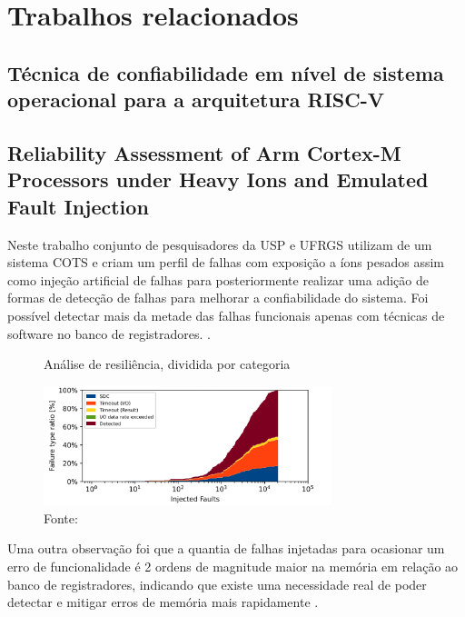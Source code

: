 \section{Trabalhos relacionados} \label{sec:trabRel}
\subsection{Técnica de confiabilidade em nível de sistema operacional para a arquitetura RISC-V}


\subsection{Reliability Assessment of Arm Cortex-M Processors under Heavy Ions and Emulated Fault Injection}

Neste trabalho conjunto de pesquisadores da USP e UFRGS utilizam de um sistema COTS e criam um perfil de falhas com exposição a íons pesados assim como injeção artificial de falhas para posteriormente realizar uma adição de formas de detecção de falhas para melhorar a confiabilidade do sistema. Foi possível detectar mais da metade das falhas funcionais apenas com técnicas de software no banco de registradores. \cite{ReliabilityArmCortexUnderHeavyIons}.

\begin{figure}[H]
    \centering
    \captionsetup{justification=centering}
    \caption{Análise de resiliência, dividida por categoria}
    \includegraphics[width=0.75\textwidth]{assets/related_works_heavy_ion_reliability.png}
    \captionsetup{justification=raggedright}
    \caption*{Fonte: }
    \label{fig:trabRelIonsPesados}
\end{figure}

Uma outra observação foi que a quantia de falhas injetadas para ocasionar um erro de funcionalidade é 2 ordens de magnitude maior na memória em relação ao banco de registradores, indicando que existe uma necessidade real de poder detectar e mitigar erros de memória mais rapidamente \cite{ReliabilityArmCortexUnderHeavyIons}.

